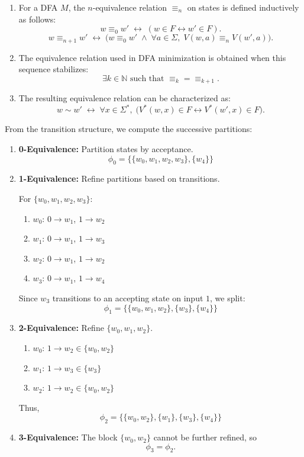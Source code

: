 \documentclass[12pt,a4paper,openany]{article}
\begin{document}
\begin{enumerate}
    \item For a DFA $M$, the $n$-equivalence relation $\equiv_n$ on states is defined inductively as follows:
    \[
    w \equiv_0 w' \;\leftrightarrow\; (w \in F \leftrightarrow w' \in F).
    \]
    \[
    w \equiv_{n+1} w' \;\leftrightarrow\;
    \bigl(w \equiv_0 w' \;\land\; \forall a \in \Sigma,\; V(w,a) \equiv_n V(w',a)\bigr).
    \]

    \item The equivalence relation used in DFA minimization is obtained when this sequence stabilizes:
    \[
    \exists k \in \mathbb{N} \text{ such that } \equiv_k = \equiv_{k+1}.
    \]

    \item The resulting equivalence relation can be characterized as:
    \[
    w \sim w' \;\leftrightarrow\;
    \forall x \in \Sigma^*,\;
    \bigl(V^*(w,x) \in F \leftrightarrow V^*(w',x) \in F\bigr).
    \]
\end{enumerate}

From the transition structure, we compute the successive partitions:

\begin{enumerate}
    \item \textbf{0-Equivalence:} Partition states by acceptance.
    \[
    \phi_0 = \bigl\{\{w_0,w_1,w_2,w_3\}, \{w_4\}\bigr\}
    \]

    \item \textbf{1-Equivalence:} Refine partitions based on transitions.

    For $\{w_0,w_1,w_2,w_3\}$:
    \begin{enumerate}
        \item $w_0$: $0 \to w_1$, $1 \to w_2$
        \item $w_1$: $0 \to w_1$, $1 \to w_3$
        \item $w_2$: $0 \to w_1$, $1 \to w_2$
        \item $w_3$: $0 \to w_1$, $1 \to w_4$
    \end{enumerate}

    Since $w_3$ transitions to an accepting state on input $1$, we split:
    \[
    \phi_1 = \bigl\{\{w_0,w_1,w_2\}, \{w_3\}, \{w_4\}\bigr\}
    \]

    \item \textbf{2-Equivalence:} Refine $\{w_0,w_1,w_2\}$.

    \begin{enumerate}
        \item $w_0$: $1 \to w_2 \in \{w_0,w_2\}$
        \item $w_1$: $1 \to w_3 \in \{w_3\}$
        \item $w_2$: $1 \to w_2 \in \{w_0,w_2\}$
    \end{enumerate}

    Thus,
    \[
    \phi_2 = \bigl\{\{w_0,w_2\}, \{w_1\}, \{w_3\}, \{w_4\}\bigr\}
    \]

    \item \textbf{3-Equivalence:} The block $\{w_0,w_2\}$ cannot be further refined, so
    \[
    \phi_3 = \phi_2.
    \]
\end{enumerate}
\end{document}
